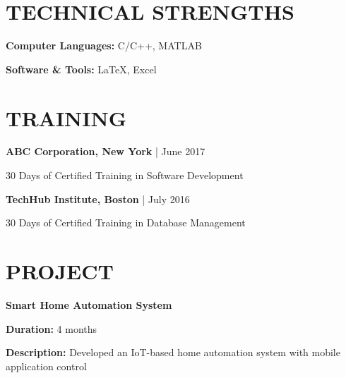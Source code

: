 \documentclass[11pt,a4paper]{article}
\begin{document}
\vspace{4pt}


\section*{TECHNICAL STRENGTHS}

\textbf{Computer Languages:} C/C++, MATLAB

\textbf{Software \& Tools:} LaTeX, Excel

\vspace{4pt}


\section*{TRAINING}

\textbf{ABC Corporation, New York} | June 2017

30 Days of Certified Training in Software Development

\vspace{6pt}

\textbf{TechHub Institute, Boston} | July 2016

30 Days of Certified Training in Database Management

\vspace{4pt}


\section*{PROJECT}

\textbf{Smart Home Automation System}

\textbf{Duration:} 4 months

\textbf{Description:} Developed an IoT-based home automation system with mobile application control

\vspace{4pt}
\end{document}
